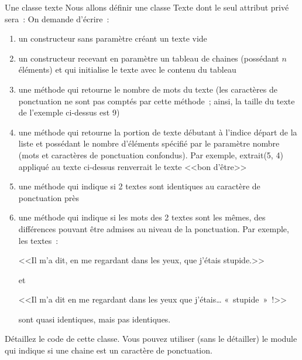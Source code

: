 \begin{Exercice}{Une classe texte}
	Nous allons définir une classe Texte dont le seul attribut privé sera~: 
	On demande d’écrire~:
	\begin{enumerate}
	\item
		un constructeur sans paramètre créant un texte vide
	\item
		un constructeur recevant en paramètre un tableau de chaines 
		(possédant $n$ éléments) et qui initialise le texte avec 
		le contenu du tableau
	\item
		une méthode 
		 qui retourne le nombre de mots du texte 
		(les caractères de ponctuation ne sont pas comptés par cette méthode~; 
		ainsi, la taille du texte de l’exemple ci-dessus est 9)
	\item
		une méthode 
		qui retourne la portion de texte débutant à l’indice départ 
		de la liste et possédant le nombre d’éléments spécifié par 
		le paramètre nombre (mots et caractères de ponctuation confondus). 
		Par exemple, extrait(5, 4) appliqué au texte ci-dessus renverrait 
		le texte <<bon d’être>>
	\item
		une méthode 
		qui indique si 2 textes sont identiques au caractère de ponctuation près
	\item
		une méthode 
		qui indique si les mots des 2 textes sont les mêmes, des différences 
		pouvant être admises au niveau de la ponctuation. Par exemple, les textes~:
		
		<<Il m’a dit, en me regardant dans les yeux, que j’étais stupide.>>
		
		et
		
		<<Il m’a dit en me regardant dans les yeux que j’étais… «~stupide~»~!>>
		
		sont quasi identiques, mais pas identiques.
	\end{enumerate}
		Détaillez le code de cette classe. Vous pouvez utiliser (sans le détailler) le module
		qui indique si une chaine est un caractère de ponctuation.
			
\end{Exercice}

